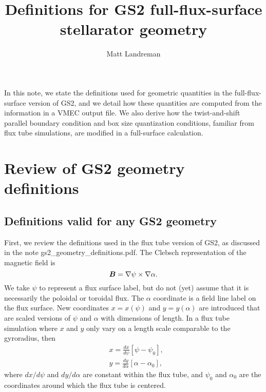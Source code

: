 \documentclass[11pt,letter]{article}
\title{Definitions for GS2 full-flux-surface stellarator geometry}
\author{Matt Landreman}
\newcommand{\vect}[1]{\mbox{\boldmath $#1$}}
\begin{document}
\maketitle

In this note, we state the definitions used for geometric quantities in the full-flux-surface
version of GS2, and we detail how these quantities are computed from the information
in a VMEC output file. We also derive how the twist-and-shift parallel boundary condition
and box size quantization conditions, familiar from flux tube simulations,
are modified in a full-surface calculation.

\section{Review of GS2 geometry definitions}

\subsection{Definitions valid for any GS2 geometry}
First, we review the definitions used in the flux tube version of GS2,
as discussed in the note {\ttfamily gs2\_geometry\_definitions.pdf}.
The Clebsch representation of the magnetic field is
\begin{equation}
\vect{B} = \nabla\psi\times\nabla\alpha.
\label{eq:Clebsch}
\end{equation}
We take $\psi$ to represent a flux surface label, but do not (yet) assume that it is necessarily the poloidal or toroidal flux. The $\alpha$ coordinate is a field line label on the flux surface.
New coordinates $x=x(\psi)$ and $y=y(\alpha)$ are introduced that are scaled versions of $\psi$ and $\alpha$ 
with dimensions of length. In a flux tube simulation where $x$ and $y$ only vary on a length scale comparable to the gyroradius, then
\begin{align}
&x = \frac{dx}{d\psi} \left[ \psi - \psi_0 \right], \\
&y = \frac{dy}{d\alpha} \left[ \alpha - \alpha_0 \right] \nonumber,
\end{align}
where $dx/d\psi$ and $dy/d\alpha$ are constant within the flux tube,
and $\psi_0$ and $\alpha_0$
are the coordinates around which the flux tube is centered.
\end{document}
